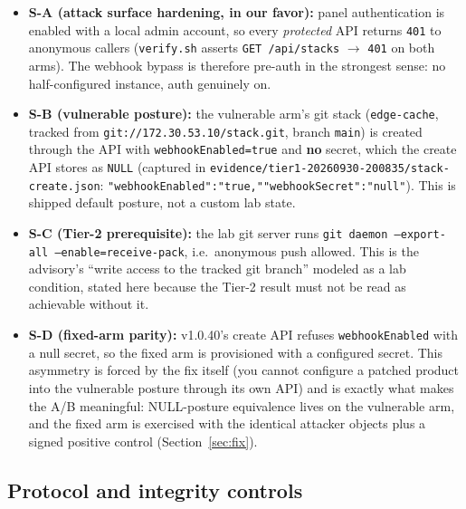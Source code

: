 \documentclass[journal]{IEEEtran}
\begin{document}
\begin{itemize}
\item \textbf{S-A (attack surface hardening, in our favor):} panel
      authentication is enabled with a local admin account, so every
      \emph{protected} API returns \texttt{401} to anonymous callers
      (\texttt{verify.sh} asserts
      \texttt{GET /api/stacks} $\rightarrow$ \texttt{401} on both arms). The
      webhook bypass is therefore pre-auth in the strongest sense: no
      half-configured instance, auth genuinely on.
\item \textbf{S-B (vulnerable posture):} the vulnerable arm's git stack
      (\texttt{edge-cache}, tracked from \texttt{git://172.30.53.10/}\allowbreak\texttt{stack.git},
      branch \texttt{main}) is created through the API with
      \texttt{webhookEnabled=true} and \textbf{no} secret, which the create
      API stores as \texttt{NULL} (captured in
      \texttt{evidence/tier1-20260930-200835/}\allowbreak\texttt{stack-create.json}:
      \texttt{"webhookEnabled":}\allowbreak\texttt{"true,"}\allowbreak\texttt{"webhookSecret":}\allowbreak\texttt{"null"}). This is shipped
      default posture, not a custom lab state.
\item \textbf{S-C (Tier-2 prerequisite):} the lab git server runs
      \texttt{git daemon --export-all --enable=receive-pack}, i.e.\ anonymous
      push allowed. This is the advisory's ``write access to the tracked
      git branch'' modeled as a lab condition, stated here because the Tier-2
      result must not be read as achievable without it.
\item \textbf{S-D (fixed-arm parity):} v1.0.40's create API refuses
      \texttt{webhookEnabled} with a null secret, so the fixed arm is
      provisioned with a configured secret. This asymmetry is forced by the
      fix itself (you cannot configure a patched product into the vulnerable
      posture through its own API) and is exactly what makes the A/B
      meaningful: NULL-posture equivalence lives on the vulnerable arm, and
      the fixed arm is exercised with the identical attacker objects plus a
      signed positive control (Section~\ref{sec:fix}).
\end{itemize}

\subsection{Protocol and integrity controls}
\end{document}
